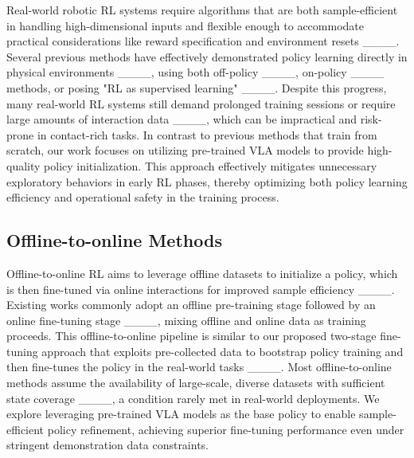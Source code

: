 Real-world robotic RL systems require algorithms that are both sample-efficient in handling high-dimensional inputs and flexible enough to accommodate practical considerations like reward specification and environment resets ____. Several previous methods have effectively demonstrated policy learning directly in physical environments ____, using both off-policy ____, on-policy ____ methods, or posing "RL as supervised learning" ____. Despite this progress, many real-world RL systems still demand prolonged training sessions or require large amounts of interaction data ____, which can be impractical and risk-prone in contact-rich tasks. In contrast to previous methods that train from scratch, our work focuses on utilizing pre-trained VLA models to provide high-quality policy initialization. This approach effectively mitigates unnecessary exploratory behaviors in early RL phases, thereby optimizing both policy learning efficiency and operational safety in the training process.

\subsection{Offline-to-online Methods}

Offline-to-online RL aims to leverage offline datasets to initialize a policy, which is then fine-tuned via online interactions for improved sample efficiency ____. Existing works commonly adopt an offline pre-training stage followed by an online fine-tuning stage ____, mixing offline and online data as training proceeds. This offline-to-online pipeline is similar to our proposed two-stage fine-tuning approach that exploits pre-collected data to bootstrap policy training and then fine-tunes the policy in the real-world tasks ____. Most offline-to-online methods assume the availability of large-scale, diverse datasets with sufficient state coverage ____, a condition rarely met in real-world deployments. We explore leveraging pre-trained VLA models as the base policy to enable sample-efficient policy refinement, achieving superior fine-tuning performance even under stringent demonstration data constraints.
